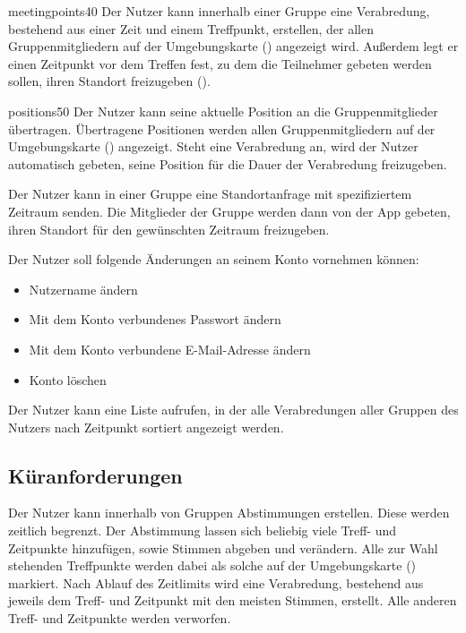 \documentclass[parskip=full,11pt]{scrartcl}
\begin{document}
    {meetingpoints}{40}
%
Der Nutzer kann innerhalb einer Gruppe eine Verabredung, bestehend aus einer
Zeit und einem Treffpunkt, erstellen, der allen Gruppenmitgliedern auf der
Umgebungskarte () angezeigt wird.
Außerdem legt er einen Zeitpunkt vor dem Treffen fest,
zu dem die Teilnehmer gebeten werden sollen,
ihren Standort freizugeben ().

    {positions}{50}
%
Der Nutzer kann seine aktuelle Position an die Gruppenmitglieder übertragen.
Übertragene Positionen werden allen Gruppenmitgliedern auf der Umgebungskarte
() angezeigt.
Steht eine Verabredung an, wird der Nutzer automatisch gebeten, seine Position
für die Dauer der Verabredung freizugeben.

%
Der Nutzer kann in einer Gruppe eine Standortanfrage mit spezifiziertem
Zeitraum senden.
Die Mitglieder der Gruppe werden dann von der App gebeten,
ihren Standort für den gewünschten Zeitraum freizugeben.

%
Der Nutzer soll folgende Änderungen an seinem Konto vornehmen können:
\begin{itemize}
		\item Nutzername ändern
    \item Mit dem Konto verbundenes Passwort ändern
    \item Mit dem Konto verbundene E-Mail-Adresse ändern
    \item Konto löschen
\end{itemize}

%
%
Der Nutzer kann eine Liste aufrufen, in der alle Verabredungen aller Gruppen
des Nutzers nach Zeitpunkt sortiert angezeigt werden.

\subsection{Küranforderungen}

%
Der Nutzer kann innerhalb von Gruppen Abstimmungen erstellen.
Diese werden zeitlich begrenzt.
Der Abstimmung lassen sich beliebig viele Treff- und Zeitpunkte hinzufügen,
sowie Stimmen abgeben und verändern.
Alle zur Wahl stehenden Treffpunkte werden dabei als solche auf der
Umgebungskarte () markiert.
Nach Ablauf des Zeitlimits wird eine Verabredung, bestehend aus jeweils dem
Treff- und Zeitpunkt mit den meisten Stimmen, erstellt.
Alle anderen Treff- und Zeitpunkte werden verworfen.
\end{document}

